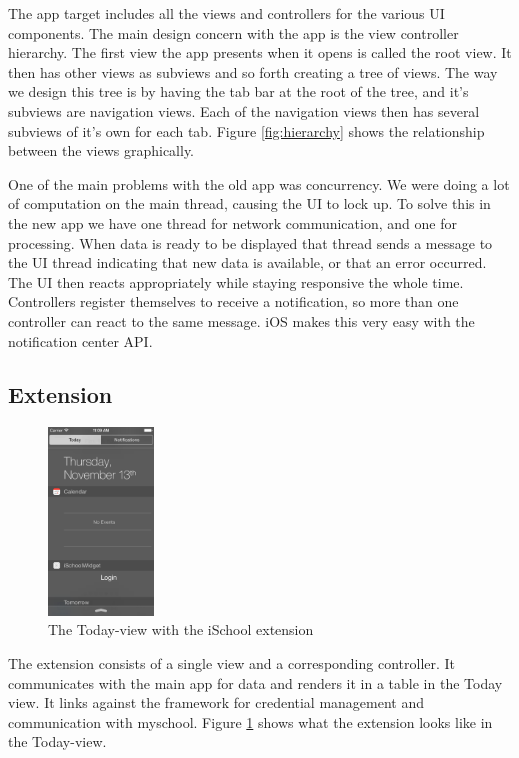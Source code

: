 \documentclass[pdftex, DIV=calc, paper=a4, fontsize=11pt, twocolumn]{scrartcl}	 %
\begin{document}
The app target includes all the views and controllers for the various UI components. 
The main design concern with the app is the view controller hierarchy. The first view the app 
presents when it opens is called the root view. It then has other views as subviews and so forth
creating a tree of views. The way we design this tree is by having the tab bar at the root of the
tree, and it's subviews are navigation views. Each of the navigation views then has several subviews
of it's own for each tab. Figure \ref{fig:hierarchy} shows the relationship between the views
graphically.

One of the main problems with the old app was concurrency. We were doing a lot of computation on 
the main thread, causing the UI to lock up. To solve this in the new app we have one thread for 
network communication, and one for processing. When data is ready to be displayed that thread sends
a message to the UI thread indicating that new data is available, or that an error occurred. The UI
then reacts appropriately while staying responsive the whole time. Controllers register themselves 
to receive a notification, so more than one controller can react to the same message. iOS makes this
very easy with the notification center API.


\subsection*{Extension}

\begin{figure}
    \centering
    \includegraphics[width=0.25\textwidth]{Todayview-ph.png}
    \caption{The Today-view with the iSchool extension}
    \label{fig:today}
\end{figure}

The extension consists of a single view and a corresponding controller. It communicates with the
main app for data and renders it in a table in the Today view. It links against the framework for 
credential management and communication with myschool. Figure \ref{fig:today} shows what the
extension looks like in the Today-view.
\end{document}
